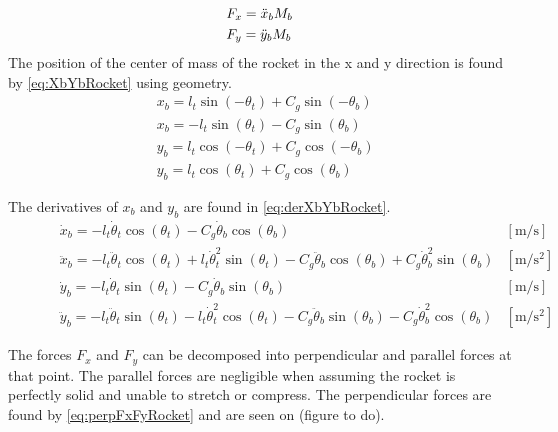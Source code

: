 		\begin{subequations}  \label{eq:FxFyRocket}
			\begin{flalign}
				& F_x=\ddot{x}_bM_b  \addunit{\newton}\\
				& F_y=\ddot{y}_bM_b  \addunit{\newton}\\
			\end{flalign}
		\end{subequations}
		\startexplain
		\stopexplain
		The position of the center of mass of the rocket in the x and y direction is found by \vref{eq:XbYbRocket} using geometry.
		\begin{subequations}\label{eq:XbYbRocket} 
			\begin{flalign}
				& x_b=l_t\sin (-\theta_t)+C_g \sin (-\theta_b) \\
				& x_b=-l_t\sin (\theta_t)-C_g \sin (\theta_b) \\
				& y_b = l_t\cos (-\theta_t)+C_g \cos(-\theta_b) \\
				& y_b = l_t\cos (\theta_t)+C_g \cos(\theta_b) 
			\end{flalign}
		\end{subequations}
		
		The derivatives of $x_b$ and $y_b$ are found in \vref{eq:derXbYbRocket}.
		\begin{subequations}\label{eq:derXbYbRocket} 
			\begin{flalign}
				\hspace{30pt} & \dot{x}_b=-l_t\dot{\theta}_t\cos(\theta_t)-C_g\dot{\theta}_b\cos(\theta_b) & [\si{\meter\per\second}] \\
				& \ddot{x}_b=-l_t\ddot{\theta}_t\cos(\theta_t)+l_t\dot{\theta}_t^2\sin(\theta_t)-C_g\ddot{\theta}_b\cos(\theta_b)+C_g\dot{\theta}_b^2\sin(\theta_b) & [\si{\meter\per\square\second}] \\
				& 
				\dot{y}_b=-l_t \dot{\theta}_t\sin(\theta_t)-C_g\dot{\theta}_b\sin(\theta_b) & [\si{\meter\per\second}] \\
				& \ddot{y}_b=-l_t\ddot{\theta}_t\sin(\theta_t)-l_t\dot{\theta}_t^2\cos(\theta_t)-C_g\ddot{\theta}_b\sin(\theta_b)-C_g\dot{\theta}_b^2\cos(\theta_b) & [\si{\meter\per\square\second}]
			\end{flalign}
		\end{subequations}
		
		The forces $F_x$ and $F_y$ can be decomposed into perpendicular and parallel forces at that point. The parallel forces are negligible when assuming the rocket is perfectly solid and unable to stretch or compress. The perpendicular forces are found by \vref{eq:perpFxFyRocket} and are seen on (figure to do).
		
